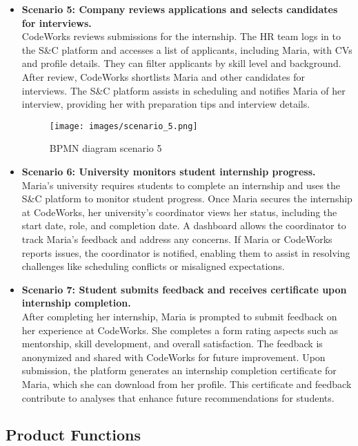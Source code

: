 \begin{itemize}
    \item \textbf{Scenario 5: Company reviews applications and selects candidates for interviews.} \\ 
    CodeWorks reviews submissions for the internship. The HR team logs in to the S\&C platform and accesses a list of applicants, including Maria, with CVs and profile details. They can filter applicants by skill level and background. After review, CodeWorks shortlists Maria and other candidates for interviews. The S\&C platform assists in scheduling and notifies Maria of her interview, providing her with preparation tips and interview details.

    \begin{figure}[!ht]
    \centering
    \texttt{[image: images/scenario\_5.png]}
    \caption{BPMN diagram scenario 5}
    \end{figure}

    \item \textbf{Scenario 6: University monitors student internship progress.} \\
    Maria’s university requires students to complete an internship and uses the S\&C platform to monitor student progress. Once Maria secures the internship at CodeWorks, her university’s coordinator views her status, including the start date, role, and completion date. A dashboard allows the coordinator to track Maria’s feedback and address any concerns. If Maria or CodeWorks reports issues, the coordinator is notified, enabling them to assist in resolving challenges like scheduling conflicts or misaligned expectations.

    \item \textbf{Scenario 7: Student submits feedback and receives certificate upon internship completion.}  \\
    After completing her internship, Maria is prompted to submit feedback on her experience at CodeWorks. She completes a form rating aspects such as mentorship, skill development, and overall satisfaction. The feedback is anonymized and shared with CodeWorks for future improvement. Upon submission, the platform generates an internship completion certificate for Maria, which she can download from her profile. This certificate and feedback contribute to analyses that enhance future recommendations for students.
\end{itemize}

\newpage

\subsection{Product Functions}


